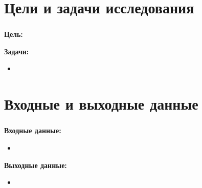 
\frame[plain]{\titlepage} %


\section{Цели и задачи исследования}

\begin{frame}
\frametitle{\insertsection}

\textbf{Цель:} 

\vspace{\baselineskip}

\textbf{Задачи:}
\begin{itemize}
    \item 
   



\end{itemize}
\end{frame}


\section{Входные и выходные данные}

\begin{frame}
\frametitle{\insertsection}

\textbf{Входные данные:}
\begin{itemize}
    \item 



\end{itemize}

\vspace{\baselineskip}

\textbf{Выходные данные:}
\begin{itemize}
    \item 



\end{itemize}
\end{frame}










